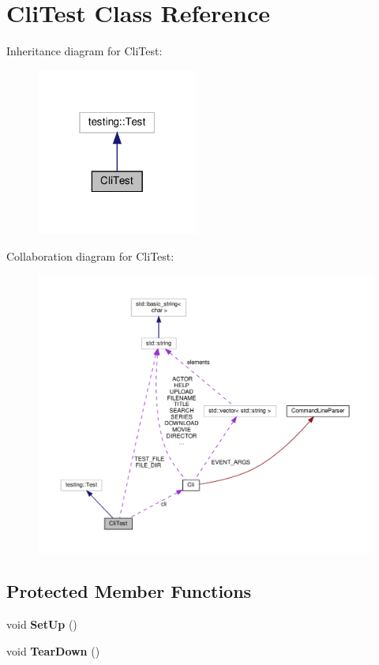 \hypertarget{classCliTest}{}\section{Cli\+Test Class Reference}
\label{classCliTest}


Inheritance diagram for Cli\+Test\+:\nopagebreak
\begin{figure}[H]
\begin{center}
\leavevmode
\includegraphics[width=151pt]{classCliTest__inherit__graph}
\end{center}
\end{figure}


Collaboration diagram for Cli\+Test\+:\nopagebreak
\begin{figure}[H]
\begin{center}
\leavevmode
\includegraphics[width=350pt]{classCliTest__coll__graph}
\end{center}
\end{figure}
\subsection*{Protected Member Functions}
\begin{DoxyCompactItemize}
\item 
\mbox{\label{classCliTest_a39680afdbe534fecb892079d256d7571}} 
void {\bfseries Set\+Up} ()
\item 
\mbox{\label{classCliTest_a6a21290abec30f2e56f8b950c5a0e842}} 
void {\bfseries Tear\+Down} ()
\end{DoxyCompactItemize}
